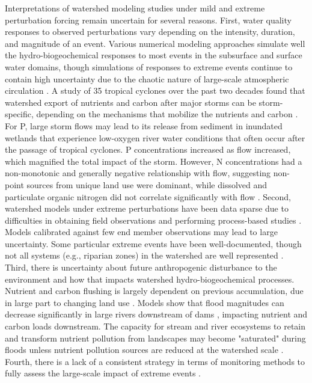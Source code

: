 \documentclass[preprint,review, 12pt]{elsarticle}
\begin{document}
Interpretations of watershed modeling studies under mild and extreme perturbation forcing remain uncertain for several reasons. First, water quality responses to observed perturbations vary depending on the intensity, duration, and magnitude of an event. Various numerical modeling approaches simulate well the hydro-biogeochemical responses to most events in the subsurface and surface water domains, though simulations of responses to extreme events continue to contain high uncertainty due to the chaotic nature of large-scale atmospheric circulation \citep{Shepherd2014}. A study of 35 tropical cyclones over the past two decades found that watershed export of nutrients and carbon after major storms can be storm-specific, depending on the mechanisms that mobilize the nutrients and carbon \citep{Paerl2018b}. For P, large storm flows may lead to its release from sediment in inundated wetlands that experience low-oxygen river water conditions that often occur after the passage of tropical cyclones. P concentrations increased as flow increased, which magnified the total impact of the storm. However, N concentrations had a non-monotonic and generally negative relationship with flow, suggesting non-point sources from unique land use were dominant, while dissolved and particulate organic nitrogen did not correlate significantly with flow  \citep{Paerl2018b}. Second, watershed models under extreme perturbations have been data sparse due to difficulties in obtaining field observations and performing process-based studies \citep{Kaushal2018g, Vidon2018}. Models calibrated against few end member observations may lead to large uncertainty. Some particular extreme events have been well-documented, though not all systems (e.g., riparian zones) in the watershed are well represented \citep{Vidon2018}. Third, there is uncertainty about future anthropogenic disturbance to the environment and how that impacts watershed hydro-biogeochemical processes. Nutrient and carbon flushing is largely dependent on previous accumulation, due in large part to changing land use \citep{Paerl2018b}. Models show that flood magnitudes can decrease significantly in large rivers downstream of dams \citep{Lu2017a}, impacting nutrient and carbon loads downstream. The capacity for stream and river ecosystems to retain and transform nutrient pollution from landscapes may become "saturated" during floods unless nutrient pollution sources are reduced at the watershed scale \citep{Kaushal2018g}. Fourth, there is a lack of a consistent strategy in terms of monitoring methods to fully assess the large-scale impact of extreme events \citep{Vidon2018}. 
\end{document}
